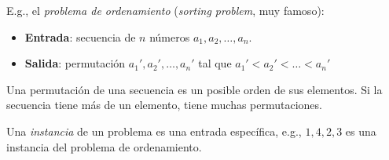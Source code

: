 E.g., el \emph{problema de ordenamiento} (\textit{sorting problem}, muy famoso):
\begin{itemize}
  \item \textbf{Entrada}: secuencia de $n$ números $a_1, a_2,\ldots,a_n$.
  \item \textbf{Salida}: permutación $a_1', a_2',\ldots,a_n'$ tal que $a_1' < a_2' < \ldots < a_n'$
\end{itemize}

Una permutación de una secuencia es un posible orden de sus elementos. Si la secuencia tiene más de un elemento, tiene muchas permutaciones. 

Una \emph{instancia} de un problema es una entrada específica, e.g., $1, 4, 2, 3$ es una instancia del problema de ordenamiento.